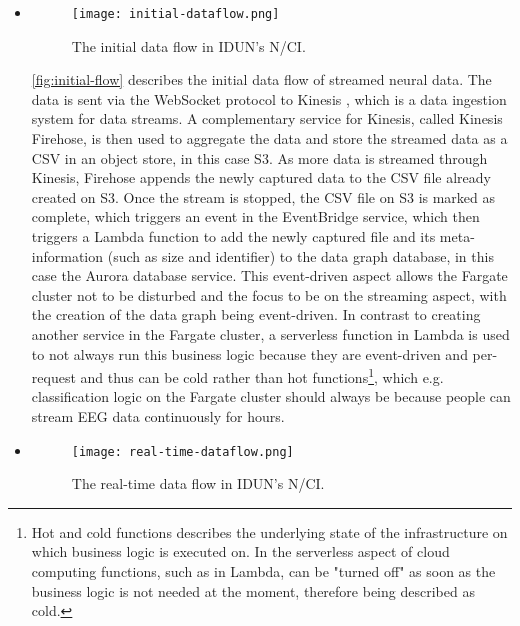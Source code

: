 \begin{itemize}
  \item  \begin{figure}[!ht]
          \centering
          \hspace*{0.4in}
          \texttt{[image: initial-dataflow.png]}
          \caption{The initial data flow in IDUN's N/CI.}
          \label{fig:initial-flow}
        \end{figure}

        \autoref{fig:initial-flow} describes the initial data flow of streamed neural data. The data is sent via the WebSocket protocol to Kinesis , which is a data ingestion system for data streams. A complementary service for Kinesis, called Kinesis Firehose, is then used to aggregate the data and store the streamed data as a CSV in an object store, in this case S3. As more data is streamed through Kinesis, Firehose appends the newly captured data to the CSV file already created on S3. Once the stream is stopped, the CSV file on S3 is marked as complete, which triggers an event in the EventBridge service, which then triggers a Lambda function to add the newly captured file and its meta-information (such as size and identifier) to the data graph database, in this case the Aurora database service. This event-driven aspect allows the Fargate cluster not to be disturbed and the focus to be on the streaming aspect, with the creation of the data graph being event-driven. In contrast to creating another service in the Fargate cluster, a serverless function in Lambda is used to not always run this business logic because they are event-driven and per-request and thus can be cold rather than hot functions\footnote{Hot and cold functions describes the underlying state of the infrastructure on which business logic is executed on. In the serverless aspect of cloud computing functions, such as in Lambda, can be "turned off" as soon as the business logic is not needed at the moment, therefore being described as cold.}, which e.g. classification logic on the Fargate cluster should always be because people can stream EEG data continuously for hours.

  \item  \begin{figure}[!ht]
          \centering
          \hspace*{0.4in}
          \texttt{[image: real-time-dataflow.png]}
          \caption{The real-time data flow in IDUN's N/CI.}
          \label{fig:realtime-flow}
        \end{figure}


\end{itemize}
